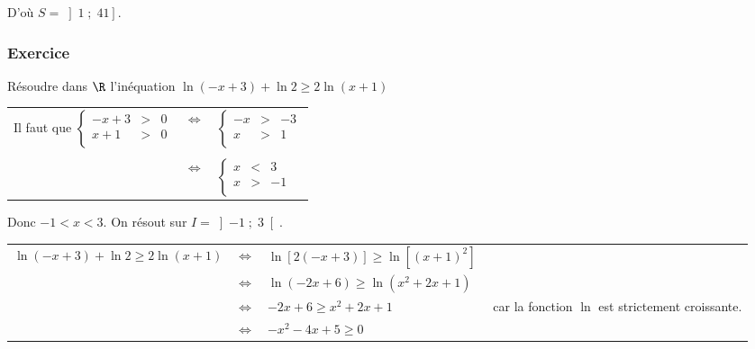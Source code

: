 \vspace*{.3cm}

D'où $S = \left]1 \; ; \; 41\right]$. 

\vspace*{-5cm}

\newpage

\subsubsection{Exercice }

Résoudre dans $\R$ l'inéquation $\ln \left(-x+3\right) + \ln 2 \geqslant 2\ln \left(x+1\right)$ \\

\begin{tabular}{lll}
Il faut que $\left\{
  \begin{array}{rll}
    -x+3 & > & 0 \\
    x+1 & > & 0 \\
  \end{array}
\right.$
& 
$\Longleftrightarrow$ & 
$\left\{
  \begin{array}{rll}
    -x & > & -3 \\
    x & > & 1 \\
  \end{array}
\right.$ \\
& & \\
& 
$\Longleftrightarrow$ & 
$\left\{
  \begin{array}{rll}
    x & < & 3 \\
    x & > & -1 \\
  \end{array}
\right.$ \\
\end{tabular}

\vspace*{.3cm}

Donc $-1 < x < 3$. On résout sur $I = \left]-1 \; ; \; 3\right[$. \\

\begin{tabular}{llll}
$\ln \left(-x+3\right) + \ln 2 \geqslant 2\ln \left(x+1\right)$ & $\Longleftrightarrow$ & $\ln\left[2\left(-x+3\right)\right] \geqslant \ln\left[\left(x+1\right)^2\right]$ & \\
& $\Longleftrightarrow$ & $\ln\left(-2x+6\right) \geqslant \ln\left(x^2 + 2x + 1\right)$ & \\
& $\Longleftrightarrow$ & $-2x + 6 \geqslant x^2 + 2x + 1$ & $\! \! \! \! \! \! \! \! \! \! \! \! \! \! \! \! \! \! \! \! \! \! \! \! \! \! \! \! \! \!$ car la fonction $\ln$ est strictement croissante. \\
& $\Longleftrightarrow$ & $-x^2 - 4x + 5 \geqslant 0$ & \\
\end{tabular}


